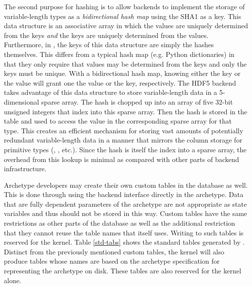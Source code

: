 The second purpose for hashing is to allow backends to implement the storage 
of variable-length types as a \emph{bidirectional hash map} using the 
\gls{SHA1} as a key.  This data structure is an associative array in which the values are 
uniquely determined from the keys \emph{and} the keys are uniquely
determined from 
the values. Furthermore, in \cyclus, the keys of this data structure are simply the 
hashes themselves. This differs from a typical hash map (e.g. Python dictionaries) 
in that they only require that values may be determined from the keys and only the
keys must be unique.  With a bidirectional hash map, knowing either the key or the value
will grant one the value or the key, respectively.  The \gls{HDF5} backend takes advantage 
of this data structure to store variable-length data in a 5-dimensional sparse array.
The hash is chopped up into an array of five 32-bit unsigned integers that 
index into this sparse array. Then the hash is stored in the table and used to access 
the value in the corresponding sparse array for that type.  This creates an efficient 
mechanism for storing vast amounts of potentially redundant variable-length data in 
a manner that mirrors the column storage for primitive types (, , 
etc.). Since the hash is itself the index into a sparse array, the overhead from 
this lookup is minimal as compared with other parts of backend infrastructure.

Archetype developers may create their own custom tables in the database as well.
This is done through using the backend interface directly in the archetype. 
Data that are fully dependent parameters of the archetype are not appropriate 
as state variables and thus should not be stored in this way.  Custom tables 
have the same restrictions as other parts of the database as well as 
the additional restriction that they cannot reuse the table names that 
\cyclus itself uses. Writing to such tables is reserved for
the kernel. 
Table \ref{std-tabs} shows the standard tables generated by \cyclus.
Distinct from the previously mentioned custom tables, the kernel will also produce 
tables whose names are based on the 
archetype specification for representing the archetype on disk.  These tables
are also reserved for the kernel alone. 

